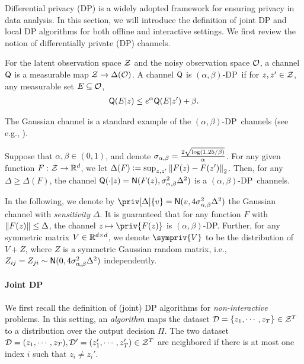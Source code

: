 



Differential privacy (DP) is a widely adopted framework for ensuring privacy in data analysis. In this section, we will introduce the definition of joint DP and local DP algorithms for both offline and interactive settings.  We first review the notion of differentially private (DP) channels.
\newcommand{\pDP}{$\alpha$-DP}
\newcommand{\aDP}{$(\alpha,\beta)$-DP}
\begin{definition}[DP channel]
For the latent observation space $\mathcal{Z}$ and the noisy observation space $\mathcal{O}$, a channel $\mathsf{Q}$ is a measurable map  $\mathcal{Z}\to\Delta(\mathcal{O})$. %
A channel $\mathsf{Q}$ is \aDP~if for $z, z'\in\mathcal{Z}$, any measurable set $E\subseteq \mathcal{O}$,
\begin{align*}
    \mathsf{Q}(E|z)\leq e^\alpha\mathsf{Q}(E|z')+\beta.
\end{align*}
\end{definition}

The Gaussian channel is a standard example of the \aDP~channels (see e.g., \citep{balle2018improving}).
\begin{definition}\label{def:Guassian-channel}
Suppose that $\alpha,\beta\in(0,1)$, and denote $\sigma_{\alpha,\beta}=\frac{2\sqrt{\log(1.25/\beta)}}{\alpha}$. For any given function $F:\mathcal{Z}\to\mathbb{R}^d$, we let $\Delta(F)\mathrel{\mathop:}= \sup_{z,z'} \left\|F(z)-F(z')\right\|_2$. Then, for any $\Delta\geq \Delta(F)$, the channel $\mathsf{Q}(\cdot|z)=\mathsf{N}( F(z), \sigma_{\alpha,\beta}^2 \Delta^2 )$ is a \aDP~channels.
\end{definition}

In the following, we denote by $\priv[\Delta]{v}=\normal{v, 4\siga^2\Delta^2}$ the Gaussian channel with \emph{sensitivity} $\Delta$. It is guaranteed that for any function $F$ with $\left\|F(z)\right\|\leq \Delta$, the channel $z\mapsto \priv{F(z)}$ is \aDP. Further, for any symmetric matrix $V\in\mathbb{R}^{d\times d}$, we denote $\sympriv{V}$ to be the distribution of $V+Z$, where $Z$ is a symmetric Gaussian random matrix, i.e., $Z_{ij}=Z_{ji}\sim \mathsf{N}(0,4\sigma_{\alpha,\beta}^2\Delta^2)$ independently. 







\paragraph{Joint DP}
We first recall the definition of (joint) DP algorithms for \emph{non-interactive} problems. In this setting, an \emph{algorithm} maps the dataset $\mathcal{D}=\{z_1,\cdots,z_T\}\in\mathcal{Z}^T$ to a distribution over the output decision $\Pi$. The two dataset $\mathcal{D}=(z_1,\cdots,z_T), \mathcal{D}'=(z_1',\cdots,z_T')\in \mathcal{Z}^T$ are neighbored if there is at most one index $i$ such that $z_i\neq z_i'$.

